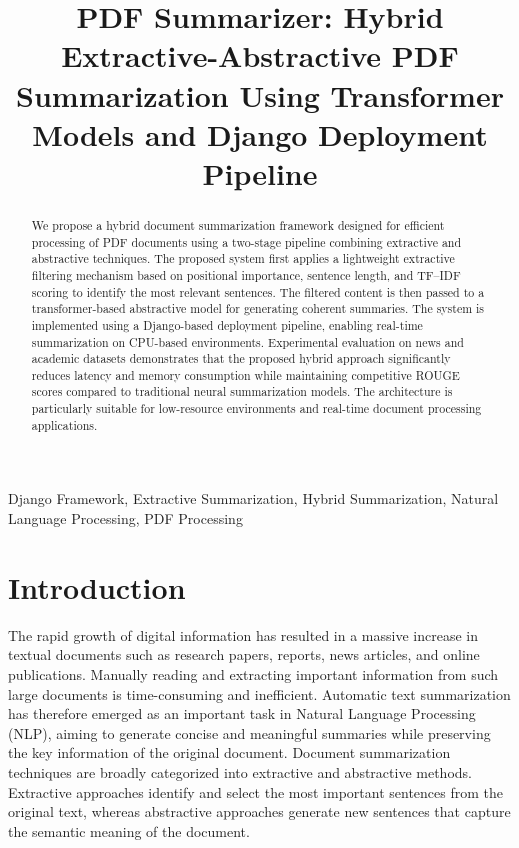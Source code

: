 \documentclass[conference]{IEEEtran}
\begin{document}
\title{PDF Summarizer: Hybrid Extractive-Abstractive
PDF Summarization Using Transformer Models and
Django Deployment Pipeline}

\author{
}

\maketitle


\begin{abstract}
We propose a hybrid document summarization framework designed for efficient processing of PDF documents using a two-stage pipeline combining extractive and abstractive techniques. The proposed system first applies a lightweight extractive filtering mechanism based on positional importance, sentence length, and TF–IDF scoring to identify the most relevant sentences. The filtered content is then passed to a transformer-based abstractive model for generating coherent summaries. The system is implemented using a Django-based deployment pipeline, enabling real-time summarization on CPU-based environments. Experimental evaluation on news and academic datasets demonstrates that the proposed hybrid approach significantly reduces latency and memory consumption while maintaining competitive ROUGE scores compared to traditional neural summarization models. The architecture is particularly suitable for low-resource environments and real-time document processing applications.
\end{abstract}

\begin{IEEEkeywords}
Django Framework, Extractive Summarization, Hybrid Summarization, Natural Language Processing, PDF Processing
\end{IEEEkeywords}


\section{Introduction}
The rapid growth of digital information has resulted in a massive increase in textual documents such as research papers, reports, news articles, and online publications. Manually reading and extracting important information from such large documents is time-consuming and inefficient. Automatic text summarization has therefore emerged as an important task in Natural Language Processing (NLP), aiming to generate concise and meaningful summaries while preserving the key information of the original document. Document summarization techniques are broadly categorized into extractive and abstractive methods. Extractive approaches identify and select the most important sentences from the original text, whereas abstractive approaches generate new sentences that capture the semantic meaning of the document.
\end{document}
